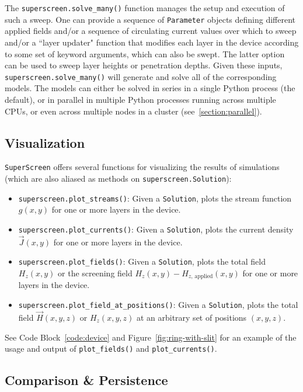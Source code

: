 \documentclass[final,3p,times,twocolumn]{elsarticle}
\newcommand{\inline}[1]{\texttt{#1}\xspace}
\newcommand{\SuperScreen}{\inline{SuperScreen}}
\begin{document}
The \inline{superscreen.solve_many()} function manages the setup and execution of such a sweep. One can provide a sequence of \inline{Parameter} objects defining different applied fields and/or a sequence of circulating current values over which to sweep and/or a ``layer updater" function that modifies each layer in the device according to some set of keyword arguments, which can also be swept. The latter option can be used to sweep layer heights or penetration depths. Given these inputs, \inline{superscreen.solve_many()} will generate and solve all of the corresponding models. The models can either be solved in series in a single Python process (the default), or in parallel in multiple Python processes running across multiple CPUs, or even across multiple nodes in a cluster (see~\ref{section:parallel}).

\subsection{Visualization}
\label{section:overview:visualization}

\SuperScreen offers several functions for visualizing the results of simulations (which are also aliased as methods on \inline{superscreen.Solution}):

\begin{itemize}
    \item{
    \inline{superscreen.plot_streams()}: Given a \inline{Solution}, plots the stream function $g(x, y)$ for one or more layers in the device.
    }
    \item{
    \inline{superscreen.plot_currents()}: Given a \inline{Solution}, plots the current density $\vec{J}(x, y)$ for one or more layers in the device.
    }
    \item{
    \inline{superscreen.plot_fields()}: Given a \inline{Solution}, plots the total field $H_z(x, y)$ or the screening field $H_z(x, y) - H_{z,\,\mathrm{applied}}(x, y)$ for one or more layers in the device.
    }
    \item{
    \inline{superscreen.plot_field_at_positions()}: Given a \inline{Solution}, plots the total field $\vec{H}(x, y, z)$ or $H_z(x, y, z)$ at an arbitrary set of positions $(x, y, z)$.
    }
\end{itemize}

See Code Block~\ref{code:device} and  Figure~\ref{fig:ring-with-slit} for an example of the usage and output of \inline{plot_fields()} and \inline{plot_currents()}.

\subsection{Comparison \& Persistence}
\label{section:overview:persistence}
\end{document}
